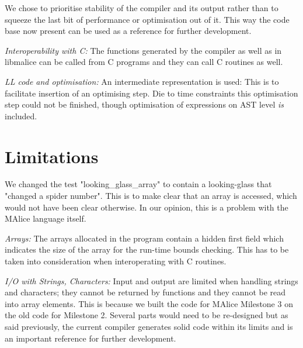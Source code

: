 \documentclass[a4paper]{article}
\begin{document}
We chose to prioritise stability of the compiler and its output rather than
to squeeze the last bit of performance or optimisation out of it. This way
the code base now present can be used as a reference for further development.

\emph{Interoperability with C:}
The functions generated by the compiler as well as in libmalice can be called
from C programs and they can call C routines as well.

\emph{LL code and optimisation:}
An intermediate representation is used: This is to facilitate insertion of an
optimising step. Die to time constraints this optimisation step could not be
finished, though optimisation of expressions on AST level \emph{is} included.


\section{Limitations}

We changed the test "looking\_glass\_array" to contain a looking-glass that
"changed a spider number". This is to make clear that an array is accessed,
which would not have been clear otherwise. In our opinion, this is a problem
with the MAlice language itself.

\emph{Arrays:}
The arrays allocated in the program contain a hidden first field which indicates
the size of the array for the run-time bounds checking. This has to be taken
into consideration when interoperating with C routines.

\emph{I/O with Strings, Characters:}
Input and output are limited when handling strings and characters; they cannot be returned
by functions and they cannot be read into array elements. This is because we built
the code for MAlice Milestone 3 on the old code for Milestone 2. Several parts
would need to be re-designed but as said previously, the current compiler
generates solid code within its limits and is an important reference for further
development.
\end{document}
